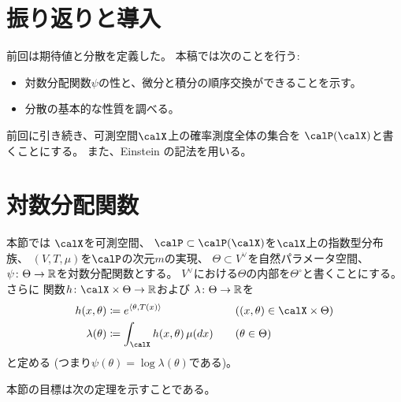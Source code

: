 \documentclass[report]{jlreq}
\begin{document}
%

%
\section{振り返りと導入}

前回は期待値と分散を定義した。
本稿では次のことを行う:
\begin{itemize}
    \item 対数分配関数$\psi$の\smooth 性と、微分と積分の順序交換ができることを示す。
    \item 分散の基本的な性質を調べる。
\end{itemize}

前回に引き続き、可測空間$\calX$上の確率測度全体の集合を
$\calP(\calX)$と書くことにする。
また、Einstein の記法を用いる。

%
\section{対数分配関数}

本節では
$\calX$を可測空間、
$\calP \subset \calP(\calX)$を$\calX$上の指数型分布族、
$(V, T, \mu)$を$\calP$の次元$m$の実現、
$\Theta \subset V^\vee$を自然パラメータ空間、
$\psi \colon \Theta \to \mathbb{R}$を対数分配関数とする。
$V^\vee$における$\Theta$の内部を$\Theta^\circ$と書くことにする。
さらに
関数$h \colon \calX \times \Theta \to \R$および
$\lambda \colon \Theta \to \mathbb{R}$を
\begin{alignat}{2}
    h(x, \theta)
        &\coloneqq e^{\langle \theta, T(x) \rangle}
        &&\quad ((x, \theta) \in \calX \times \Theta) \\
    \lambda(\theta)
        &\coloneqq \int_\calX h(x, \theta) \, \mu(dx)
        &&\quad (\theta \in \Theta)
\end{alignat}
と定める (つまり$\psi(\theta) = \log \lambda(\theta)$である)。

本節の目標は次の定理を示すことである。
\end{document}
